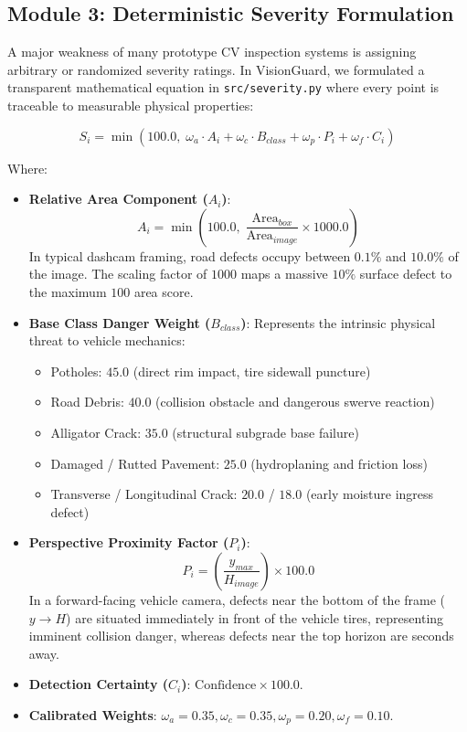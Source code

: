 \documentclass[11pt,a4paper]{article}
\begin{document}
\subsection{Module 3: Deterministic Severity Formulation}
A major weakness of many prototype CV inspection systems is assigning arbitrary or randomized severity ratings. In VisionGuard, we formulated a transparent mathematical equation in \texttt{src/severity.py} where every point is traceable to measurable physical properties:

\begin{equation}
S_i = \min\left(100.0, \; \omega_a \cdot A_i + \omega_c \cdot B_{class} + \omega_p \cdot P_i + \omega_f \cdot C_i\right)
\end{equation}

Where:
\begin{itemize}[noitemsep]
    \item \textbf{Relative Area Component ($A_i$)}:
    \begin{equation}
    A_i = \min\left(100.0, \; \frac{\text{Area}_{box}}{\text{Area}_{image}} \times 1000.0\right)
    \end{equation}
    In typical dashcam framing, road defects occupy between $0.1\%$ and $10.0\%$ of the image. The scaling factor of $1000$ maps a massive $10\%$ surface defect to the maximum $100$ area score.
    \item \textbf{Base Class Danger Weight ($B_{class}$)}: Represents the intrinsic physical threat to vehicle mechanics:
    \begin{itemize}[noitemsep]
        \item Potholes: $45.0$ (direct rim impact, tire sidewall puncture)
        \item Road Debris: $40.0$ (collision obstacle and dangerous swerve reaction)
        \item Alligator Crack: $35.0$ (structural subgrade base failure)
        \item Damaged / Rutted Pavement: $25.0$ (hydroplaning and friction loss)
        \item Transverse / Longitudinal Crack: $20.0$ / $18.0$ (early moisture ingress defect)
    \end{itemize}
    \item \textbf{Perspective Proximity Factor ($P_i$)}:
    \begin{equation}
    P_i = \left(\frac{y_{max}}{H_{image}}\right) \times 100.0
    \end{equation}
    In a forward-facing vehicle camera, defects near the bottom of the frame ($y \to H$) are situated immediately in front of the vehicle tires, representing imminent collision danger, whereas defects near the top horizon are seconds away.
    \item \textbf{Detection Certainty ($C_i$)}: $\text{Confidence} \times 100.0$.
    \item \textbf{Calibrated Weights}: $\omega_a = 0.35, \omega_c = 0.35, \omega_p = 0.20, \omega_f = 0.10$.
\end{itemize}
\end{document}
